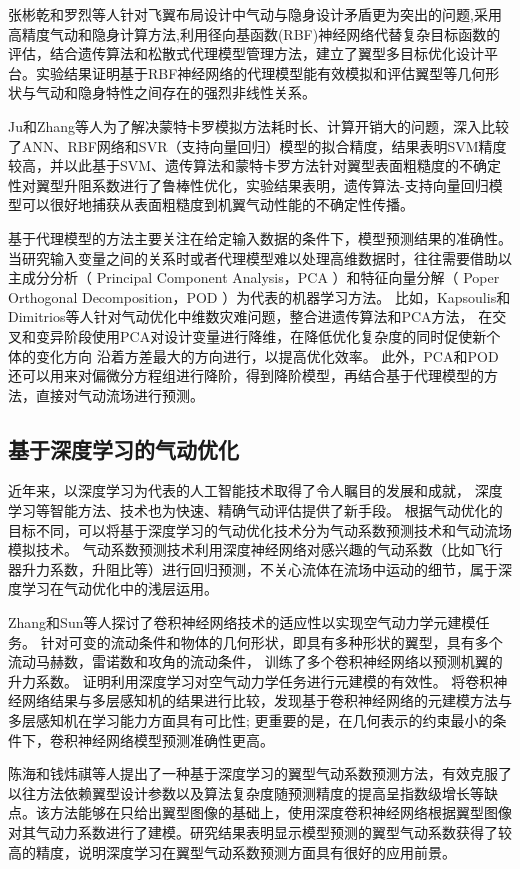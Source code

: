 张彬乾和罗烈等人\cite{张罗}针对飞翼布局设计中气动与隐身设计矛盾更为突出的问题,采用高精度气动和隐身计算方法,利用径向基函数(RBF)神经网络代替复杂目标函数的评估，结合遗传算法和松散式代理模型管理方法，建立了翼型多目标优化设计平台。实验结果证明基于RBF神经网络的代理模型能有效模拟和评估翼型等几何形状与气动和隐身特性之间存在的强烈非线性关系。

Ju和Zhang等人\cite{Ame}为了解决蒙特卡罗模拟方法耗时长、计算开销大的问题，深入比较了ANN、RBF网络和SVR（支持向量回归）模型的拟合精度，结果表明SVM精度较高，并以此基于SVM、遗传算法和蒙特卡罗方法针对翼型表面粗糙度的不确定性对翼型升阻系数进行了鲁棒性优化，实验结果表明，遗传算法-支持向量回归模型可以很好地捕获从表面粗糙度到机翼气动性能的不确定性传播。

基于代理模型的方法主要关注在给定输入数据的条件下，模型预测结果的准确性。
当研究输入变量之间的关系时或者代理模型难以处理高维数据时，往往需要借助以主成分分析（ Principal Component Analysis，PCA ）和特征向量分解（ Poper Orthogonal Decomposition，POD ）为代表的机器学习方法。
比如，Kapsoulis和Dimitrios等人\cite{Kapsoulis2018Evolutionary}针对气动优化中维数灾难问题，整合进遗传算法和PCA方法，
在交叉和变异阶段使用PCA对设计变量进行降维，在降低优化复杂度的同时促使新个体的变化方向
沿着方差最大的方向进行，以提高优化效率。
此外，PCA和POD还可以用来对偏微分方程组进行降阶，得到降阶模型，再结合基于代理模型的方法，直接对气动流场进行预测。

\subsection{基于深度学习的气动优化}
近年来，以深度学习为代表的人工智能技术取得了令人瞩目的发展和成就，
深度学习等智能方法、技术也为快速、精确气动评估提供了新手段。
根据气动优化的目标不同，可以将基于深度学习的气动优化技术分为气动系数预测技术和气动流场模拟技术。
气动系数预测技术利用深度神经网络对感兴趣的气动系数（比如飞行器升力系数，升阻比等）进行回归预测，不关心流体在流场中运动的细节，属于深度学习在气动优化中的浅层运用。

Zhang和Sun等人\cite{LiftCoefficient}探讨了卷积神经网络技术的适应性以实现空气动力学元建模任务。
针对可变的流动条件和物体的几何形状，即具有多种形状的翼型，具有多个流动马赫数，雷诺数和攻角的流动条件，
训练了多个卷积神经网络以预测机翼的升力系数。
证明利用深度学习对空气动力学任务进行元建模的有效性。
将卷积神经网络结果与多层感知机的结果进行比较，发现基于卷积神经网络的元建模方法与多层感知机在学习能力方面具有可比性;
更重要的是，在几何表示的约束最小的条件下，卷积神经网络模型预测准确性更高。

陈海和钱炜祺等人\cite{陈海2018}提出了一种基于深度学习的翼型气动系数预测方法，有效克服了以往方法依赖翼型设计参数以及算法复杂度随预测精度的提高呈指数级增长等缺点。该方法能够在只给出翼型图像的基础上，使用深度卷积神经网络根据翼型图像对其气动力系数进行了建模。研究结果表明显示模型预测的翼型气动系数获得了较高的精度，说明深度学习在翼型气动系数预测方面具有很好的应用前景。

